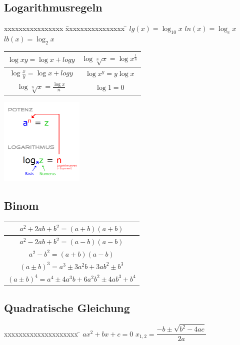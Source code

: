 \subsection{Logarithmusregeln}
\begin{minipage}{10cm}
	\begin{tabbing}
		xxxxxxxxxxxxxxxx \= xxxxxxxxxxxxxxxx \= \kill
		$lg(x) = \log_{10} x$ \> $ln(x) = \log_{e} x$ \> $lb(x) = \log_{2} x$
	\end{tabbing}
	\renewcommand{\arraystretch}{2}
	\begin{tabular}{|c|c|}
		\hline $\log{xy} = \log{x} + log{y}$ & $\log{\sqrt[n]{x}}=\log{x^\frac{1}{n}}$\\
		\hline $\log{\frac{x}{y}}= \log{x} + log{y}$ & $\log{x^y}= y\log{x}$ \\
		\hline $\log{\sqrt[n]{x}}= \frac{\log{x}}{n}$ & $\log{1}=0$\\
		\hline
	\end{tabular}
\end{minipage}
\begin{minipage}{5cm}
	\includegraphics[width=4cm]{images/potenz_logarithmus.png}	
\end{minipage}

\begin{multicols}{2}
	\subsection{Binom}
	\renewcommand{\arraystretch}{2}
	\begin{tabular}{|c|}
		\hline $a^2+2ab+b^2 = (a+b)(a+b)$\\
		\hline $a^2-2ab+b^2 = (a-b)(a-b)$\\
		\hline $a^2-b^2= (a+b)(a-b)$\\
		\hline $(a \pm b)^3 =a^3 \pm  3 a^{2} b + 3 a b^2 \pm b^3 $\\
		\hline $(a \pm b)^4 =a^4 \pm  4 a^{3} b + 6a^2b^2 \pm 4 a b^3 +	b^4$\\
		\hline
	\end{tabular}
	
	\subsection{Quadratische Gleichung}
	\begin{tabbing}
		xxxxxxxxxxxxxxxxxxxx \= \kill
		$ax^2+bx+c=0$ \> $x_{1,2} = \dfrac{-b \pm \sqrt{b^2 - 4ac}}{2a}$
	\end{tabbing}
\end{multicols}

